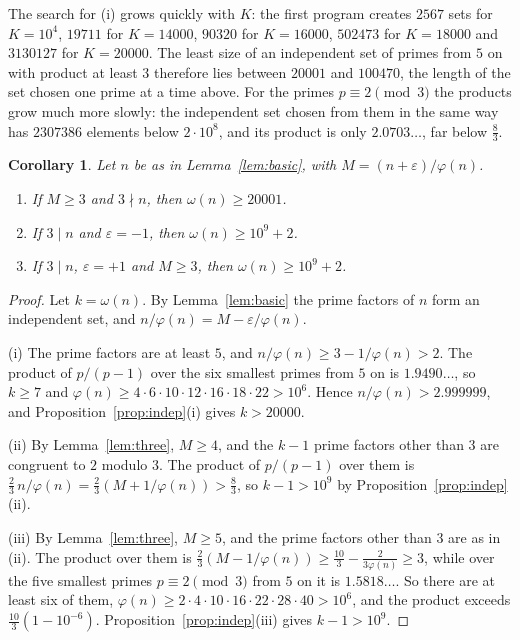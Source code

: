 \documentclass[11pt,reqno]{amsart}
\numberwithin{equation}{section}
\theoremstyle{plain}
\newtheorem{corollary}[theorem]{Corollary}
\theoremstyle{definition}
\theoremstyle{remark}
\begin{document}
The search for (i) grows quickly with $K$: the first program creates
$2567$ sets for $K=10^4$, $19711$ for $K=14000$, $90320$ for
$K=16000$, $502473$ for $K=18000$ and $3130127$ for $K=20000$. The least size of an independent
set of primes from $5$ on with product at least $3$ therefore lies
between $20001$ and $100470$, the length of the set chosen one prime
at a time above. For the primes $p\equiv2\pmod3$ the products grow
much more slowly: the independent set chosen from them in the same way
has $2307386$ elements below $2\cdot10^8$, and its product is only
$2.0703\ldots$, far below $\frac83$.

\begin{corollary}\label{cor:indep}
Let $n$ be as in Lemma~\ref{lem:basic}, with $M=(n+\varepsilon)/\varphi(n)$.
\begin{enumerate}[label=\textup{(\roman*)}]
\item If $M\ge3$ and $3\nmid n$, then $\omega(n)\ge20001$.
\item If $3\mid n$ and $\varepsilon=-1$, then $\omega(n)\ge10^9+2$.
\item If $3\mid n$, $\varepsilon=+1$ and $M\ge3$, then
  $\omega(n)\ge10^9+2$.
\end{enumerate}
\end{corollary}

\begin{proof}
Let $k=\omega(n)$. By Lemma~\ref{lem:basic} the prime factors of $n$
form an independent set, and $n/\varphi(n)=M-\varepsilon/\varphi(n)$.

(i) The prime factors are at least $5$, and
$n/\varphi(n)\ge3-1/\varphi(n)>2$. The product of $p/(p-1)$ over the
six smallest primes from $5$ on is $1.9490\ldots$, so $k\ge7$ and
$\varphi(n)\ge4\cdot6\cdot10\cdot12\cdot16\cdot18\cdot22>10^6$. Hence
$n/\varphi(n)>2.999999$, and Proposition~\ref{prop:indep}(i) gives
$k>20000$.

(ii) By Lemma~\ref{lem:three}, $M\ge4$, and the $k-1$ prime factors
other than $3$ are congruent to $2$ modulo $3$. The product of
$p/(p-1)$ over them is $\frac23\,n/\varphi(n)=\frac23(M+1/\varphi(n))>\frac83$,
so $k-1>10^9$ by Proposition~\ref{prop:indep}(ii).

(iii) By Lemma~\ref{lem:three}, $M\ge5$, and the prime factors other
than $3$ are as in (ii). The product over them is
$\frac23(M-1/\varphi(n))\ge\frac{10}3-\frac2{3\varphi(n)}\ge3$, while
over the five smallest primes $p\equiv2\pmod3$ from $5$ on it is
$1.5818\ldots$. So there are at least six of them,
$\varphi(n)\ge2\cdot4\cdot10\cdot16\cdot22\cdot28\cdot40>10^6$, and the
product exceeds $\frac{10}3(1-10^{-6})$. Proposition~\ref{prop:indep}(iii)
gives $k-1>10^9$.
\end{proof}
\end{document}
